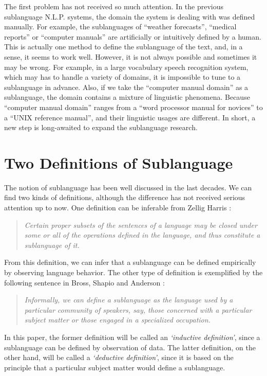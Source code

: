 The first problem has not received so much attention.
In the previous sublanguage N.L.P. systems, 
the domain the system is dealing with was defined manually.
For example, the sublanguages of ``weather forecasts'',
``medical reports'' or ``computer manuals''
are artificially or intuitively  defined by a human.
This is actually one method to define the sublanguage of the text,
and, in a sense, it seems to work well.
However, it is not always possible and sometimes it may be wrong.
For example, in a large vocabulary speech recognition system,
which may has to handle a variety of domains,
it is impossible to tune to a sublanguage in advance.
Also, if we take the ``computer manual domain'' as a sublanguage,
the domain contains a mixture of linguistic phenomena.
Because ``computer manual domain'' ranges from a ``word processor manual for novices''
to a ``UNIX reference manual'',
and their linguistic usages are different.
In short, a new step is long-awaited to expand the sublanguage research.


\section{Two Definitions of Sublanguage}

The notion of sublanguage has been well discussed in the last decades.
We can find two kinds of definitions, although the difference
has not received serious attention up to now.
One definition can be inferable from Zellig Harris \cite{Harris:68}:

\begin{quotation}
{\it Certain proper subsets of the sentences of a language may be closed
under some or all of the operations defined in the language,
and thus constitute a sublanguage of it.}
\end{quotation}

From this definition, we can infer that a sublanguage can be defined empirically
by observing language behavior.
The other type of definition is exemplified by the following sentence in
Bross, Shapio and Anderson \cite{Bross:72}:

\begin{quotation}
{\it Informally, we can define a sublanguage as the language used by a particular
community of speakers, say, those concerned with a particular
subject matter or those engaged in a specialized occupation.}
\end{quotation}

In this paper, the former definition will be called 
an {\it `inductive definition'}, since a sublanguage can be defined by
observation of data.
The latter definition, on the other hand, will be called
a {\it `deductive definition'}, since it is based on the principle that
a particular subject matter would define a sublanguage.

